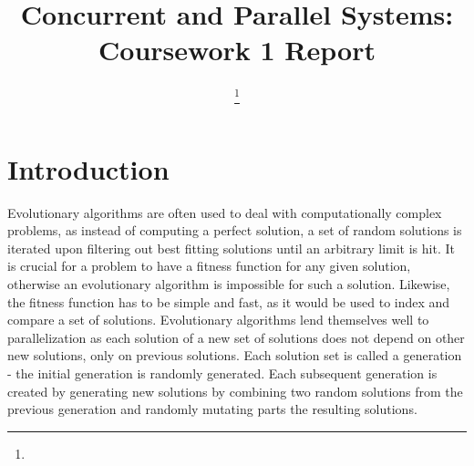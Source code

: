 \documentclass[journal,transmag]{IEEEtran}
\begin{document}
\title{Concurrent and Parallel Systems: Coursework 1 Report}

\author{


\thanks{}}





\maketitle

\IEEEdisplaynontitleabstractindextext

\IEEEpeerreviewmaketitle

\section{Introduction}


        Evolutionary algorithms \cite{evol} are often used to deal with computationally complex problems,
        as instead of computing a perfect solution, a set of random solutions is iterated upon
        filtering out best fitting solutions until an arbitrary limit is hit. It is crucial for
        a problem to have a fitness function for any given solution, otherwise an evolutionary
        algorithm is impossible for such a solution. Likewise, the fitness function has to be
        simple and fast, as it would be used to index and compare a set of solutions. Evolutionary
        algorithms lend themselves well to parallelization as each solution of a new set of solutions
        does not depend on other new solutions, only on previous solutions. Each solution set is called
        a generation - the initial generation is randomly generated. Each subsequent generation
        is created by generating new solutions by combining two random solutions from the previous
        generation and randomly mutating parts the resulting solutions.
        
\end{document}
